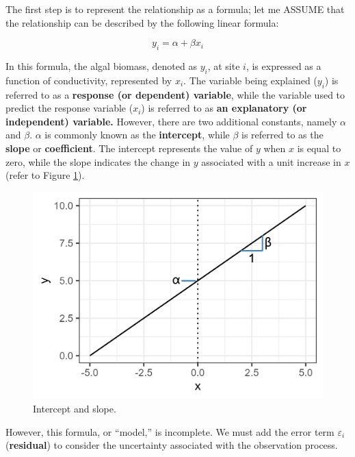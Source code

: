 \documentclass[
]{book}
\begin{document}
The first step is to represent the relationship as a formula; let me ASSUME that the relationship can be described by the following linear formula:

\[
y_i = \alpha + \beta x_i
\]

In this formula, the algal biomass, denoted as \(y_i\), at site \(i\), is expressed as a function of conductivity, represented by \(x_i\). The variable being explained (\(y_i\)) is referred to as a \textbf{response (or dependent) variable}, while the variable used to predict the response variable (\(x_i\)) is referred to as \textbf{an explanatory (or independent) variable.} However, there are two additional constants, namely \(\alpha\) and \(\beta\). \(\alpha\) is commonly known as the \textbf{intercept}, while \(\beta\) is referred to as the \textbf{slope} or \textbf{coefficient}. The intercept represents the value of \(y\) when \(x\) is equal to zero, while the slope indicates the change in \(y\) associated with a unit increase in \(x\) (refer to Figure \ref{fig:intercept-slope}).

\begin{figure}

{\centering \includegraphics[width=14.58in]{image/figure_lm} 

}

\caption{Intercept and slope.}\label{fig:intercept-slope}
\end{figure}

However, this formula, or ``model,'' is incomplete. We must add the error term \(\varepsilon_i\) (\textbf{residual}) to consider the uncertainty associated with the observation process.
\end{document}
